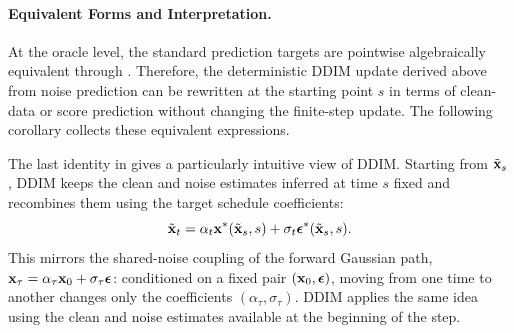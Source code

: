 \paragraph{Equivalent Forms and Interpretation.}
At the oracle level, the standard prediction targets are pointwise
algebraically equivalent through .
Therefore, the deterministic DDIM update derived above from noise prediction
can be rewritten at the starting point $s$ in terms of clean-data or score
prediction without changing the finite-step update. The following corollary
collects these equivalent expressions.


The last identity in  gives a particularly intuitive
view of DDIM. Starting from $\tilde{{\mathbf{x}}}_s$, DDIM keeps the clean and noise
estimates inferred at time $s$ fixed and recombines them using the target
schedule coefficients:
\[
\tilde{{\mathbf{x}}}_t
=
\alpha_t{\mathbf{x}}^*(\tilde{{\mathbf{x}}}_s,s)
+
\sigma_t{\bm{\epsilon}}^*(\tilde{{\mathbf{x}}}_s,s).
\]
This mirrors the shared-noise coupling of the forward Gaussian path,
${\mathbf{x}}_\tau=\alpha_\tau{\mathbf{x}}_0+\sigma_\tau{\bm{\epsilon}}$: conditioned on a fixed pair
$({\mathbf{x}}_0,{\bm{\epsilon}})$, moving from one time to another changes only the coefficients
$(\alpha_\tau,\sigma_\tau)$. DDIM applies the same idea using the clean and
noise estimates available at the beginning of the step.

